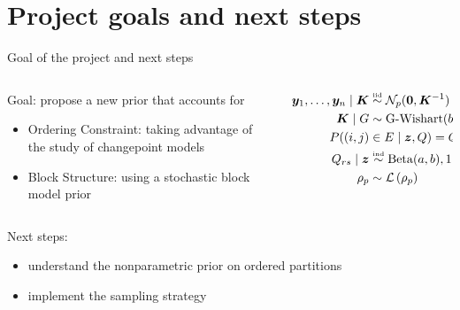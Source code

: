 \section{Project goals and next steps}
\begin{frame}{Goal of the project and next steps}

\vspace*{0.5cm}
\begin{columns}

    \begin{column}{0.4\textwidth}
        \alert{Goal:} propose a \alert{new prior} that accounts for
        \begin{itemize}
            \item Ordering Constraint: taking advantage of the study of changepoint models
            \item Block Structure: using a stochastic block model prior
        \end{itemize}
    \end{column}
    \begin{column}{0.6\textwidth}
        \begin{align*}
        \bm{y}_1, \ldots, \bm{y}_n \mid \bm{K} & \overset{\text{\tiny{iid}}}{\sim} \mathcal{N}_p(\mathbf{0}, \bm{K}^{-1} ) \\
        \bm{K} \mid G & \sim \operatorname{G-Wishart}(b, D)\\
        P((i,j)&\in E\mid \bm{z},Q) = Q_{z_{i} z_{j}},\,\text{independent}\\
            Q_{rs} \mid \bm{z} &\overset{\text{\tiny{ind}}}{\sim} \operatorname{Beta}(a,b), 1\leq r\leq s\leq H\\
        \rho_p & \sim \mathcal{L}\left(\rho_p\right)
        \end{align*}  
    \end{column}
\end{columns}
\vspace*{0.5cm}


\alert{Next steps:}
\begin{itemize}
\item understand the nonparametric prior on ordered partitions
\item implement the sampling strategy
\end{itemize}

\end{frame}

